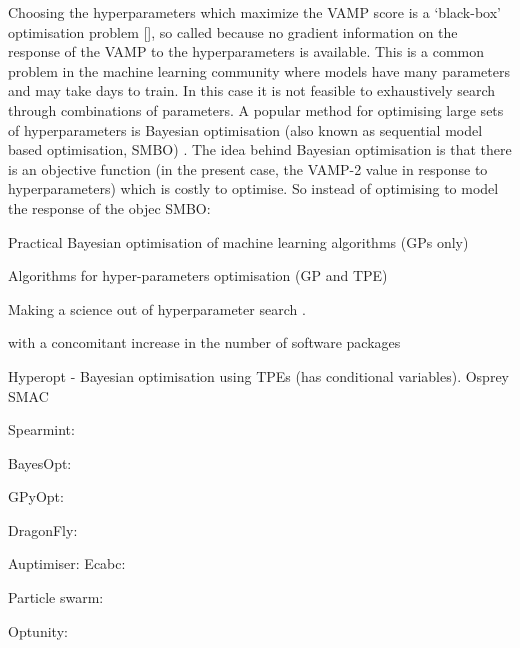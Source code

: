 Choosing the hyperparameters which maximize the VAMP score is a `black-box' optimisation problem [], so called because no gradient information on the response of the VAMP to the hyperparameters is available. This is a common problem in the machine learning community where models have many parameters and may take days to train. In this case it is not feasible to exhaustively search through combinations of parameters. A popular method for optimising large sets of hyperparameters is Bayesian optimisation (also known as sequential model based optimisation, SMBO)  \cite{hutterSequentialModelbasedOptimization2011} \cite{NIPS2012_4522}\cite{bergstraAlgorithmsHyperParameterOptimizationa} \cite{bergstraMakingScienceModel2013}. The idea behind Bayesian optimisation is  \cite{brochuTutorialBayesianOptimization2010} that there is an objective function (in the present case, the VAMP-2 value in response to hyperparameters) which is costly to optimise. So instead of optimising to model the response of the objec
SMBO: \cite{hutterSequentialModelbasedOptimization2011}

Practical Bayesian optimisation of machine learning algorithms \cite{NIPS2012_4522} (GPs only)

Algorithms for hyper-parameters optimisation \cite{bergstraAlgorithmsHyperParameterOptimizationa} (GP and TPE)

Making a science out of hyperparameter search \cite{bergstraMakingScienceModel2013}. 


with a concomitant increase in the number of software packages 


\cite{bergstraHyperoptPythonLibrary2013} Hyperopt - Bayesian optimisation using TPEs (has conditional variables). 
\cite{mcgibbonOspreyHyperparameterOptimization2016a} Osprey
\cite{hutterSequentialModelbasedOptimization2011} SMAC

Spearmint: \cite{DBLP:conf/uai/GelbartSA14}\cite{snoekAbstractBayesianOptimization2013}\cite{snoekInputWarpingBayesian2014a}\cite{NIPS2013_5086}\cite{NIPS2012_4522}

BayesOpt: \cite{martinez-cantinBayesOptBayesianOptimization2014}

GPyOpt: \cite{gpyopt2016}

DragonFly: \cite{JMLR:v21:18-223}

Auptimiser: \cite{liuAuptimizerExtensibleOpenSource2019}
Ecabc: \cite{Sharma2019}

Particle swarm: \cite{lorenzo2017particle}

Optunity: \cite{claesenEasyHyperparameterSearch2014}



